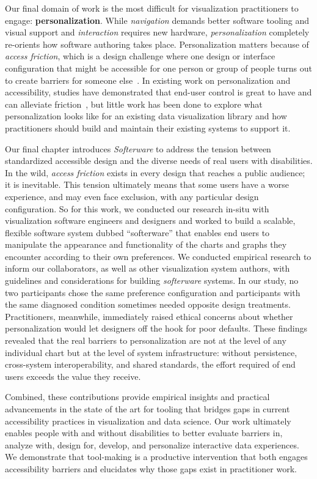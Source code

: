 \documentclass[12pt]{cmuthesis}
\begin{document}
Our final domain of work is the most difficult for visualization practitioners to engage: \textbf{personalization}. While \textit{navigation} demands better software tooling and visual support and \textit{interaction} requires new hardware, \textit{personalization} completely re-orients how software authoring takes place. Personalization matters because of \textit{access friction}, which is a design challenge where one design or interface configuration that might be accessible for one person or group of people turns out to create barriers for someone else~\cite{Hsueh, Hamraie}. In existing work on personalization and accessibility, studies have demonstrated that end-user control is great to have and can alleviate friction~\cite{Jones2024,Wood2023}, but little work has been done to explore what personalization looks like for an existing data visualization library and how practitioners should build and maintain their existing systems to support it.

Our final chapter introduces \textit{Softerware} to address the tension between standardized accessible design and the diverse needs of real users with disabilities. In the wild, \textit{access friction} exists in every design that reaches a public audience; it is inevitable. This tension ultimately means that some users have a worse experience, and may even face exclusion, with any particular design configuration. So for this work, we conducted our research in-situ with visualization software engineers and designers and worked to build a scalable, flexible software system dubbed ``softerware'' that enables end users to manipulate the appearance and functionality of the charts and graphs they encounter according to their own preferences. We conducted empirical research to inform our collaborators, as well as other visualization system authors, with guidelines and considerations for building \textit{softerware} systems. In our study, no two participants chose the same preference configuration and participants with the same diagnosed condition sometimes needed opposite design treatments. Practitioners, meanwhile, immediately raised ethical concerns about whether personalization would let designers off the hook for poor defaults. These findings revealed that the real barriers to personalization are not at the level of any individual chart but at the level of system infrastructure: without persistence, cross-system interoperability, and shared standards, the effort required of end users exceeds the value they receive.

Combined, these contributions provide empirical insights and practical advancements in the state of the art for tooling that bridges gaps in current accessibility practices in visualization and data science. Our work ultimately enables people with and without disabilities to better evaluate barriers in, analyze with, design for, develop, and personalize interactive data experiences. We demonstrate that tool-making is a productive intervention that both engages accessibility barriers and elucidates why those gaps exist in practitioner work.
\end{document}

